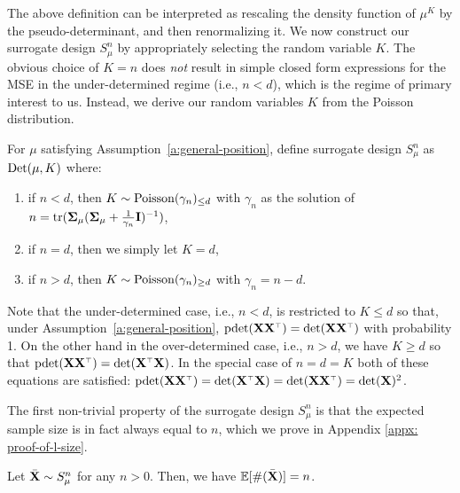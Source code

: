 \documentclass[11pt]{article}
\begin{document}
\noindent
The above definition can be
interpreted as rescaling the density function of $\mu^K$ by the
pseudo-determinant, and then renormalizing it.
We now construct our surrogate design $S_\mu^n$ by appropriately
selecting the random variable $K$.
The obvious choice of $K=n$ does \emph{not} result in simple closed
form expressions for the MSE in the under-determined regime (i.e.,
$n<d$), which is the regime of primary interest to us.
Instead, we derive our random variables $K$ from the Poisson
distribution.
\begin{definition}\label{d:surrogate}
  For $\mu$ satisfying Assumption~\ref{a:general-position},
  define surrogate design $S_\mu^n$ as ${\mathrm{Det}}(\mu,K)$ where:
  \vspace{-2mm}
  \begin{enumerate}
    \item if $n<d$, then $K\sim {\operatorname{Poisson}}(\gamma_n)_{\leq d}$ with
          $\gamma_n$ as the solution of
          $n=\mathrm{tr}(\mathbf{\Sigma}_\mu(\mathbf{\Sigma}_\mu+\frac1{\gamma_n}\mathbf I)^{-1})$,
          \vspace{-2mm}
    \item if $n=d$, then we simply let $K=d$,
          \vspace{-2mm}
    \item if $n>d$, then $K\sim{\operatorname{Poisson}}(\gamma_n)_{\geq d}$ with $\gamma_n=n-d$.
  \end{enumerate}
\end{definition}

\noindent
Note that the under-determined case, i.e., $n<d$, is restricted to $K\leq d$ so that, under Assumption~\ref{a:general-position}, $\pdet(\X\X^\top)=\det(\X\X^\top)$ with probability 1.
On the other hand in the over-determined case, i.e., $n>d$, we have
$K\geq d$ so that $\pdet(\X\X^\top)=\det(\X^\top\X)$. In the special case
of $n=d=K$ both of these equations are satisfied: $\pdet(\X\X^\top)=\det(\X^\top\X)=\det(\X\X^\top)=\det(\X)^2$.

The first non-trivial property of the surrogate design $S_\mu^n$ is
that the expected sample size is in fact always equal to $n$, which we
prove in Appendix \ref{appx: proof-of-l-size}.
\begin{lemma} \label{l:size}
  Let ${\bar{\mathbf X}}\sim S_\mu^n$ for any $n>0$.
  Then, we have $\mathbb E[\#({\bar{\mathbf X}})] = n$.
\end{lemma}
\end{document}
